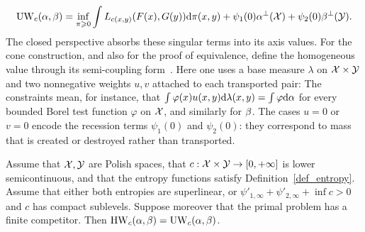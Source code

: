 \[
	\operatorname{UW}_c(\alpha,\beta)
	=
	\inf_{\pi\geqslant0}
	\int L_{c(x,y)}(F(x),G(y))\mathrm{d}\pi(x,y)
	+
	\psi_1(0)\alpha^\perp(\mathcal{X})
	+
	\psi_2(0)\beta^\perp(\mathcal{Y}).
\]
The closed perspective absorbs these singular terms into its axis values. For the cone construction, and also for the proof of equivalence, define the homogeneous value through its semi-coupling form~\cite{LieroMielkeSavareLong}. Here one uses a base measure $\lambda$ on $\mathcal{X}\times\mathcal{Y}$ and two nonnegative weights $u,v$ attached to each transported pair:
The constraints mean, for instance, that
$\int \varphi(x)u(x,y)\mathrm{d}\lambda(x,y)=\int\varphi\mathrm{d}\alpha$ for every bounded Borel
test function $\varphi$ on $\mathcal{X}$, and similarly for $\beta$. The cases $u=0$ or
$v=0$ encode the recession terms $\psi_1(0)$ and $\psi_2(0)$: they correspond
to mass that is created or destroyed rather than transported.

\begin{prop}\label{prop-homogeneous-unbalanced}
	Assume that $\mathcal{X},\mathcal{Y}$ are Polish spaces, that $c:\mathcal{X}\times\mathcal{Y}\to[0,+\infty]$ is lower semicontinuous, and that the entropy functions satisfy Definition~\ref{def_entropy}. Assume that either both entropies are superlinear, or
	$\psi'_{1,\infty}+\psi'_{2,\infty}+\inf c>0$ and $c$ has compact sublevels. Suppose moreover that the primal problem has a finite competitor. Then
	$\operatorname{HW}_c(\alpha,\beta)=\operatorname{UW}_c(\alpha,\beta)$.
\end{prop}


